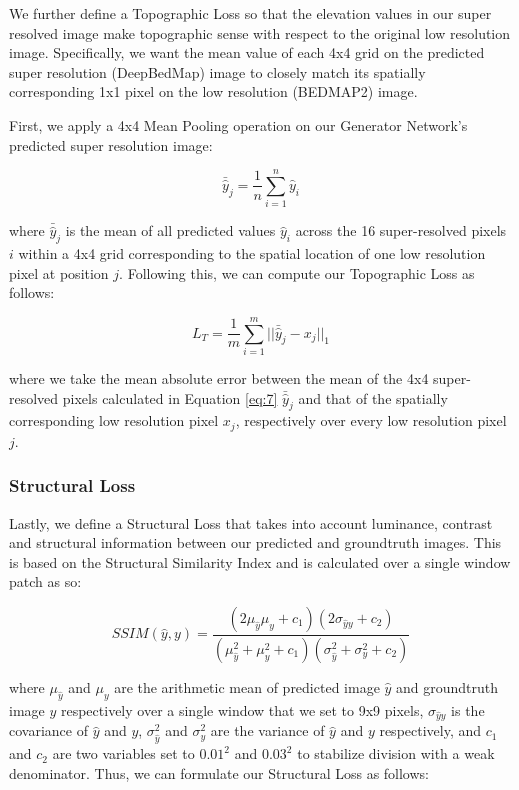 \documentclass[tc, manuscript]{copernicus}
\begin{document}
We further define a Topographic Loss so that the elevation values in our super resolved image make topographic sense with respect to the original low resolution image.
Specifically, we want the mean value of each 4x4 grid on the predicted super resolution (DeepBedMap) image to closely match its spatially corresponding 1x1 pixel on the low resolution (BEDMAP2) image.

First, we apply a 4x4 Mean Pooling operation on our Generator Network's predicted super resolution image:

\begin{equation}\label{eq:7}
 \bar{\hat{y}}_j = \dfrac{1}{n} \sum\limits_{i=1}^n \hat{y}_i
\end{equation}

where $\bar{\hat{y}}_j$ is the mean of all predicted values $\hat{y}_i$ across the 16 super-resolved pixels $i$ within a 4x4 grid corresponding to the spatial location of one low resolution pixel at position $j$.
Following this, we can compute our Topographic Loss as follows:

\begin{equation}\label{eq:8}
  L_T = \dfrac{1}{m} \sum\limits_{i=1}^m ||\bar{\hat{y}}_j - x_j||_{1}
\end{equation}

where we take the mean absolute error between the mean of the 4x4 super-resolved pixels calculated in Equation \eqref{eq:7} $\bar{\hat{y}}_j$ and that of the spatially corresponding low resolution pixel $x_j$, respectively over every low resolution pixel $j$.

\subsubsection{Structural Loss}

Lastly, we define a Structural Loss that takes into account luminance, contrast and structural information between our predicted and groundtruth images.
This is based on the Structural Similarity Index \citep[SSIM,][]{WangImageQualityAssessment2004} and is calculated over a single window patch as so:

\begin{equation}\label{eq:9}
  SSIM(\hat{y}, y) = \dfrac{(2\mu_{\hat{y}}\mu_y + c_1)(2\sigma_{{\hat{y}}y} + c_2)}{(\mu_{\hat{y}}^2 + \mu_y^2 + c_1)(\sigma_{\hat{y}}^2 + \sigma_y^2 + c_2)}
\end{equation}

where $\mu_{\hat{y}}$ and $\mu_y$ are the arithmetic mean of predicted image ${\hat{y}}$ and groundtruth image $y$ respectively over a single window that we set to 9x9 pixels, $\sigma_{{\hat{y}}y}$ is the covariance of ${\hat{y}}$ and $y$, $\sigma_{\hat{y}}^2$ and $\sigma_y^2$ are the variance of ${\hat{y}}$ and $y$ respectively, and $c_1$ and $c_2$ are two variables set to $0.01^2$ and $0.03^2$ to stabilize division with a weak denominator.
Thus, we can formulate our Structural Loss as follows:
\end{document}
